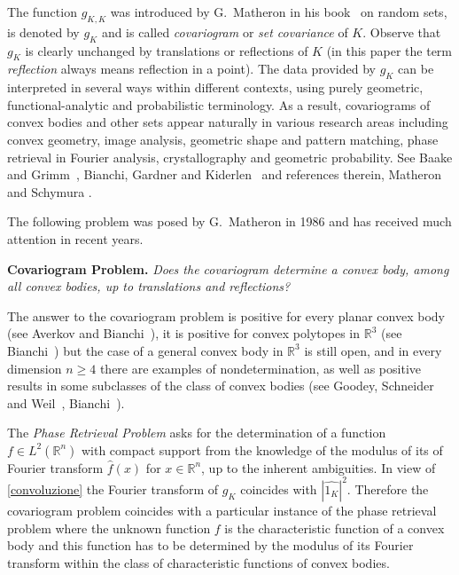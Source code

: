 \documentclass[a4paper]{amsart}
\theoremstyle{definition}
\numberwithin{equation}{section}
\begin{document}
The function $g_{K,K}$  was introduced by G.~Matheron in his book~\cite[Section~4.3]{Matheron-1975} on random sets, is denoted by $g_K$ and is called \emph{covariogram} or \emph{set covariance} of $K$. Observe that $g_K$ is clearly unchanged by  translations or reflections of $K$ (in this paper the term \emph{reflection}  always means reflection in a point).
The data provided by \( g_K \) can be interpreted in several ways within different contexts, using purely geometric, functional-analytic and probabilistic terminology.
As a result, covariograms of convex bodies and other sets appear naturally in various research areas including convex geometry, image analysis, geometric shape and pattern matching, phase retrieval in Fourier analysis, crystallography and geometric probability. See Baake and Grimm~\cite{BaakeGrimm}, Bianchi, Gardner and Kiderlen~\cite{BiGaKi11} and references therein, Matheron~\cite{Matheron-1975} and Schymura \cite{Schymura-2011}.

The following  problem  was posed by G.~Matheron in 1986 and has received much attention in recent years.

\smallskip

\textbf{Covariogram Problem.} \emph{Does the covariogram determine a
convex body, among all convex bodies, up to translations and
reflections?}

\smallskip

The answer to the covariogram problem is positive for every planar convex body (see Averkov and Bianchi~\cite{averkov-bianchi-2009}), it is positive for convex polytopes in ${\mathbb{R}}^3$ (see Bianchi~\cite{Bianchi-2009-polytopes}) but the case of a general convex body in ${\mathbb{R}}^3$ is still open, and in every dimension $n\geq4$ there are examples of nondetermination, as well as positive results in some subclasses of the class of convex bodies (see Goodey, Schneider and Weil~\cite{Goodey-Schneider-Weil-1997}, Bianchi~\cite{Bianchi-2005}).

The \emph{Phase Retrieval Problem} asks for the determination of  a function $f\in L^2({\mathbb{R}}^n)$ with compact support from the knowledge of the modulus of its of Fourier transform ${\widehat{{{f}}}}(x)$ for $x\in{\mathbb{R}}^n$, up to the inherent ambiguities. 
In view of \eqref{convoluzione} the Fourier transform of $g_K$ coincides with $|{\widehat{{{1_K}}}}|^2$. Therefore the covariogram problem coincides with a particular instance of the phase retrieval problem where the unknown function $f$ is the characteristic function of a convex body and this function has to be determined by the modulus of its Fourier transform within the class of characteristic functions of convex bodies.
\end{document}
